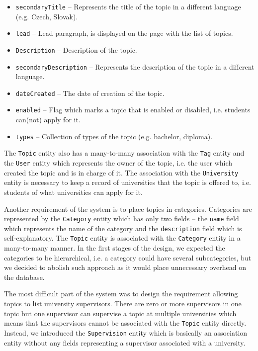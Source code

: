 \begin{itemize}
    \item \texttt{secondaryTitle} -- Represents the title of the topic in a different language (e.g. Czech, Slovak).
    \item \texttt{lead} -- Lead paragraph, is displayed on the page with the list of topics.
    \item \texttt{Description} -- Description of the topic.
    \item \texttt{secondaryDescription} -- Represents the description of the topic in a different language.
    \item \texttt{dateCreated} -- The date of creation of the topic.
    \item \texttt{enabled} -- Flag which marks a topic that is enabled or disabled, i.e. students can(not) apply for it.
    \item \texttt{types} -- Collection of types of the topic (e.g. bachelor, diploma).
\end{itemize}

The \texttt{Topic} entity also has a many-to-many association with the \texttt{Tag} entity and the \texttt{User} entity which represents the owner of the topic, i.e. the user which created the topic and is in charge of it. The association with the \texttt{University} entity is necessary to keep a record of universities that the topic is offered to, i.e. students of what universities can apply for it.

Another requirement of the system is to place topics in categories. Categories are represented by the \texttt{Category} entity which has only two fields -- the \texttt{name} field which represents the name of the category and the \texttt{description} field which is self-explanatory. The \texttt{Topic} entity is associated with the \texttt{Category} entity in a many-to-many manner. In the first stages of the design, we expected the categories to be hierarchical, i.e. a category could have several subcategories, but we decided to abolish such approach as it would place unnecessary overhead on the database.

The most difficult part of the system was to design the requirement allowing topics to list university supervisors. There are zero or more supervisors in one topic but one supervisor can supervise a topic at multiple universities which means that the supervisors cannot be associated with the \texttt{Topic} entity directly. Instead, we introduced the \texttt{Supervision} entity which is basically an association entity without any fields representing a supervisor associated with a university.

